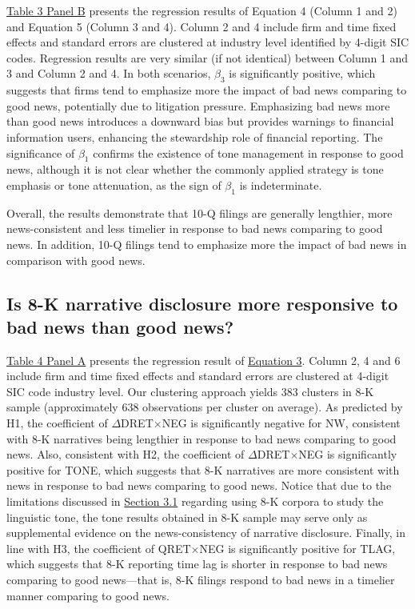\documentclass[a4paper]{article}
\begin{document}
\begin{spacing}{2}
\hyperref[T3PB]{Table 3 Panel B} presents the regression results of Equation 4 (Column 1 and 2) and Equation 5 (Column 3 and 4). Column 2 and 4 include firm and time fixed effects and standard errors are clustered at industry level identified by 4-digit SIC codes. Regression results are very similar (if not identical) between Column 1 and 3 and Column 2 and 4. In both scenarios, $\beta_3$ is significantly positive, which suggests that firms tend to emphasize more the impact of bad news comparing to good news, potentially due to litigation pressure. Emphasizing bad news more than good news introduces a downward bias but provides warnings to financial information users, enhancing the stewardship role of financial reporting. The significance of $\beta_1$ confirms the existence of tone management in response to good news, although it is not clear whether the commonly applied strategy is tone emphasis or tone attenuation, as the sign of $\beta_1$ is indeterminate.

Overall, the results demonstrate that 10-Q filings are generally lengthier, more news-consistent and less timelier in response to bad news comparing to good news. In addition, 10-Q filings tend to emphasize more the impact of bad news in comparison with good news. 

\subsection{Is 8-K narrative disclosure more responsive to bad news than good news?}
\hyperref[T4PA]{Table 4 Panel A} presents the regression result of \hyperref[eq3]{Equation 3}. Column 2, 4 and 6 include firm and time fixed effects and standard errors are clustered at 4-digit SIC code industry level. Our clustering approach yields 383 clusters in 8-K sample (approximately 638 observations per cluster on average). As predicted by H1, the coefficient of $\Delta$DRET$\times$NEG is significantly negative for NW, consistent with 8-K narratives being lengthier in response to bad news comparing to good news. Also, consistent with H2, the coefficient of $\Delta$DRET$\times$NEG is significantly positive for TONE, which suggests that 8-K narratives are more consistent with news in response to bad news comparing to good news. Notice that due to the limitations discussed in \hyperref[sec3.1]{Section 3.1} regarding using 8-K corpora to study the linguistic tone, the tone results obtained in 8-K sample may serve only as supplemental evidence on the news-consistency of narrative disclosure. Finally, in line with H3, the coefficient of QRET$\times$NEG is significantly positive for TLAG, which suggests that 8-K reporting time lag is shorter in response to bad news comparing to good news---that is, 8-K filings respond to bad news in a timelier manner comparing to good news.


\end{spacing}
\end{document}
